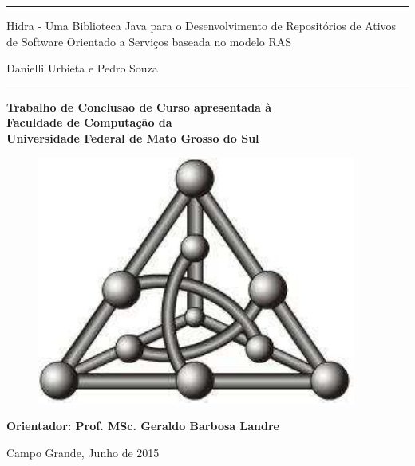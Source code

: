 
\begin{center}
\noindent \rule{\linewidth}{.1cm}

\vspace*{1cm}

{\LARGE \textsf{Hidra - Uma Biblioteca Java para o Desenvolvimento de Repositórios de Ativos de Software Orientado a Serviços baseada no modelo RAS}}

\vspace*{1cm}

{\Large \textsf{Danielli Urbieta e Pedro Souza}}

\vspace*{1cm}

\noindent \rule{\linewidth}{.1cm}

\vspace*{1cm}

{\large

\textbf{Trabalho de Conclusao de Curso apresentada à} \\
\textbf{Faculdade de Computa\c{c}\~{a}o da} \\
\textbf{Universidade Federal de Mato Grosso do Sul}

}

\vspace*{1cm}

\begin{figure}[htb]
\begin{center}
\includegraphics{images/grafo}
\end{center}
\end{figure}
\vspace{2 cm}

\textbf{Orientador: Prof. MSc. Geraldo Barbosa Landre}


Campo Grande, Junho de 2015

\end{center}
